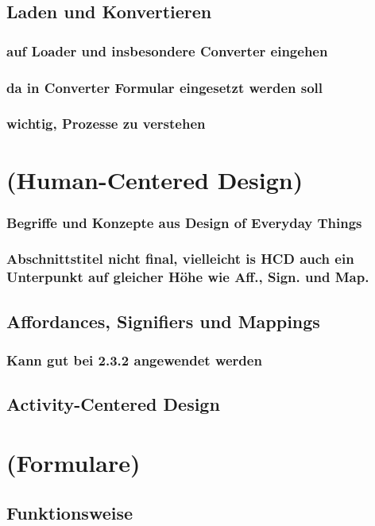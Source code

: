 \documentclass[a4paper, 12pt, oneside, BCOR=1cm,toc=chapterentrywithdots]{scrbook}
\begin{document}
\subsection{Laden und Konvertieren}
\subsubsection{auf Loader und insbesondere Converter eingehen}
\subsubsection{da in Converter Formular eingesetzt werden soll}
\subsubsection{wichtig, Prozesse zu verstehen}




\clearpage
\section{(Human-Centered Design)}
\subsubsection{Begriffe und Konzepte aus Design of Everyday Things}
\subsubsection{Abschnittstitel nicht final, vielleicht is HCD auch ein Unterpunkt auf gleicher Höhe wie Aff., Sign. und Map.}
\subsection{Affordances, Signifiers und Mappings}
\subsubsection{Kann gut bei 2.3.2 angewendet werden}
\subsection{Activity-Centered Design}

\clearpage
\section{(Formulare)}
\cite{wroblewskiWebForm2008}
\subsection{Funktionsweise}
\end{document}
